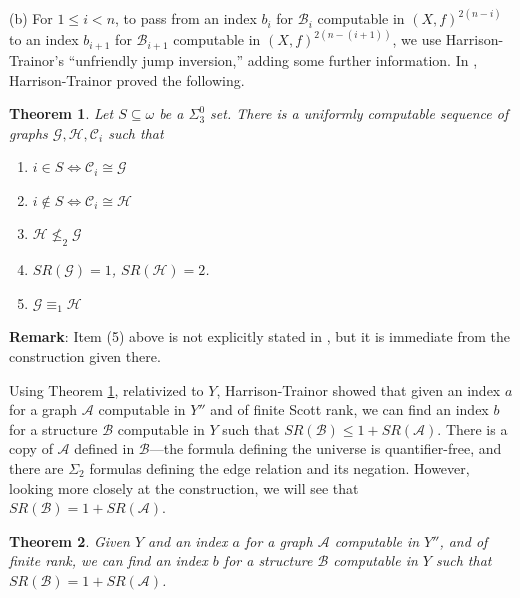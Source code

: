 \documentclass{article}
\newtheorem{thm}{Theorem}[section]
\begin{document}
\bigskip
\noindent
(b)  For $1\leq i < n$, to pass from an index $b_i$ for $\mathcal{B}_i$ computable in $(X,f)^{2(n-i)}$ to an index $b_{i+1}$ for $\mathcal{B}_{i+1}$ computable in $(X,f)^{2(n-(i+1))}$, we use Harrison-Trainor's ``unfriendly jump inversion,'' adding some further information.  In \cite{HTarith}, Harrison-Trainor proved the following. 

\begin{thm}\label{thm:MHT}
    Let $S\subseteq\omega$ be a $\Sigma_3^0$ set. There is a uniformly computable sequence of graphs $\mathcal{G},\mathcal{H},\mathcal{C}_i$ such that
    \begin{enumerate}
        \item $i\in S \iff\mathcal{C}_i\cong\mathcal{G}$
        \item $i\not\in S \iff\mathcal{C}_i\cong\mathcal{H}$
        \item $\mathcal{H}\not\leq_2\mathcal{G}$
        \item $SR(\mathcal{G}) = 1$, $SR(\mathcal{H}) = 2$.
        \item $\mathcal{G}\equiv_1\mathcal{H}$
    \end{enumerate}
\end{thm}

\noindent
\textbf{Remark}:  Item (5) above is not explicitly stated in \cite{HTarith}, but it is immediate from the construction given there.

\bigskip

Using Theorem \ref{thm:MHT}, relativized to $Y$, Harrison-Trainor showed that given an index $a$ for a graph $\mathcal{A}$ computable in $Y''$ and of finite Scott rank, we can find an index $b$ for a structure $\mathcal{B}$ computable in $Y$ such that $SR(\mathcal{B}) \leq 1+SR(\mathcal{A})$.  There is a copy of $\mathcal{A}$ defined in $\mathcal{B}$---the formula defining the universe is quantifier-free, and there are $\Sigma_2$ formulas defining the edge relation and its negation.  However, looking more closely at the construction, we will see that $SR(\mathcal{B}) = 1+SR(\mathcal{A})$.    

\begin{thm}

Given $Y$ and an index $a$ for a graph $\mathcal{A}$ computable in $Y''$, and of finite rank, we can find an index $b$ for a structure $\mathcal{B}$ computable in $Y$ such that $SR(\mathcal{B}) = 1+SR(\mathcal{A})$.  

\end{thm}  
\end{document}

